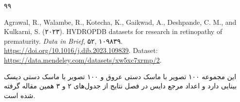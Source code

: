 \begin{thebibliography}{۹۹}
\begin{latin}
Agrawal, R., Walambe, R., Kotecha, K., Gaikwad, A., Deshpande, C. M., and Kulkarni, S. (۲۰۲۳). HVDROPDB datasets for research in retinopathy of prematurity. \textit{Data in Brief}, ۵۲, ۱۰۹۸۳۹. \url{https://doi.org/10.1016/j.dib.2023.109839}. Dataset: \url{https://data.mendeley.com/datasets/xw5xc7xrmp/2}.
\end{latin}
این مجموعه ۱۰۰ تصویر با ماسک دستی عروق و ۱۰۰ تصویر با ماسک دستی دیسک بینایی دارد و اعداد مرجع دایس در فصل نتایج از جدول‌های ۲ و ۳ همین مقاله گرفته شده است.
\end{thebibliography}
\clearpage